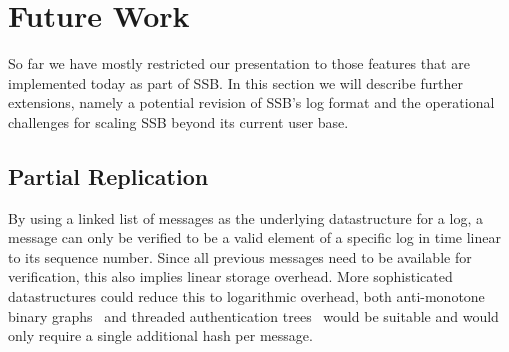 \documentclass[9pt,sigconf]{acmart}
\begin{document}


\section{Future Work} %
\label{sec:wip}

So far we have mostly restricted our presentation to those features that are implemented today as part of SSB. In this section we will describe further extensions, namely a potential revision of SSB's log format and the operational challenges for scaling SSB beyond its current user base. %


\subsection{Partial Replication}

By using a linked list of messages as the underlying datastructure for a log, a message can only be verified to be a valid element of a specific log in time linear to its sequence number. Since all previous messages need to be available for verification, this also implies linear storage overhead. More sophisticated datastructures could reduce this to logarithmic overhead, both anti-monotone binary graphs~\cite{buldas1998new} and threaded authentication trees~\cite{buldas2000optimally} would be suitable and would only require a single additional hash per message.
\end{document}
